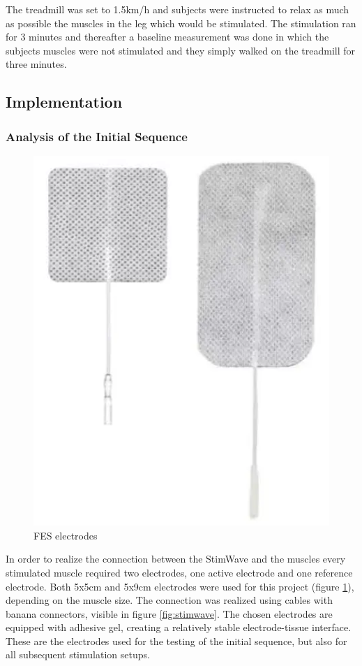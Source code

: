 
The treadmill was set to 1.5km/h and subjects were instructed to relax as much as possible the muscles in the leg which would be stimulated. The stimulation ran for 3 minutes and thereafter a baseline measurement was done in which the subjects muscles were not stimulated and they simply walked on the treadmill for three minutes. 


\subsection{Implementation}
\subsubsection{Analysis of the Initial Sequence}
\begin{figure} 
    \centering
    \includegraphics[width=\linewidth]{images/electrodes.png}
    \caption{FES electrodes}
    \label{fig:electrodes}
\end{figure}
In order to realize the connection between the StimWave and the muscles every stimulated muscle required two electrodes, one active electrode and one reference electrode. Both 5x5cm and 5x9cm electrodes were used for this project (figure \ref{fig:electrodes}), depending on the muscle size. The connection was realized using cables with banana connectors, visible in figure \ref{fig:stimwave}. The chosen electrodes are equipped with adhesive gel, creating a relatively stable electrode-tissue interface. These are the electrodes used for the testing of the initial sequence, but also for all subsequent stimulation setups.

